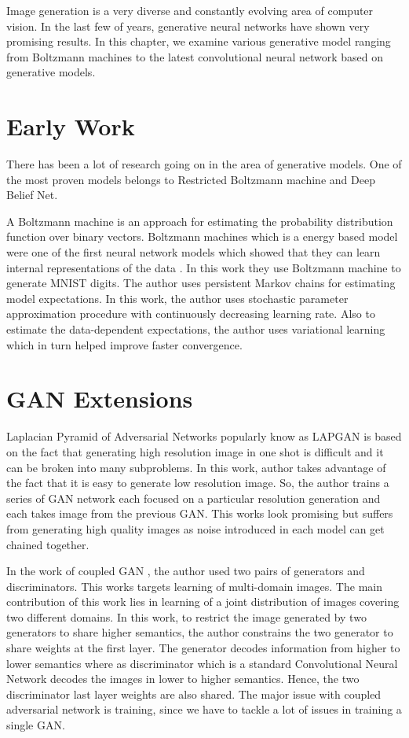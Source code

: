 \doublespacing
{} 
\label{chap:RelatedWork}

Image generation is a very diverse and constantly evolving area of computer vision. In the last few of years, generative neural networks have shown very promising results. In this chapter, we examine various generative model ranging from Boltzmann machines to the latest convolutional neural network based on generative models.
\section{Early Work}

There has been a lot of research going on in the area of generative models. One of the most proven models belongs to Restricted Boltzmann machine and Deep Belief Net.

A Boltzmann machine is an approach for estimating the probability distribution function over binary vectors. Boltzmann machines which is  a energy based model were one of the first neural network models which showed that they can learn internal representations of the data \cite{Boltzman-Wiki}.
In this work they use Boltzmann machine to generate MNIST digits. The author uses persistent Markov chains for estimating model expectations. In this work, the author uses stochastic parameter approximation procedure with continuously decreasing learning rate. Also to estimate the data-dependent expectations, the author uses variational learning which in turn helped improve faster convergence. 



\section{GAN Extensions}

Laplacian Pyramid of Adversarial Networks \cite{LAPGAN} popularly know as LAPGAN is based on the fact that generating high resolution image in one shot is difficult and it can be broken into many subproblems. In this work, author takes advantage of the fact that it is easy to generate low resolution image. So, the author trains a series of GAN network each focused on a particular resolution generation and each takes image from the previous GAN. This works look promising but suffers from generating high quality images as noise introduced in each model can get chained together. 
\par
In the work of coupled GAN \cite{Co-GAN}, the author used two pairs of generators and discriminators. This works targets learning of multi-domain images. The main contribution of this work lies in learning of a joint distribution of images covering two different domains. In this work, to restrict the image generated by two generators to share higher semantics, the author constrains the two generator to share weights at the first layer. The generator decodes information from higher to lower semantics where as discriminator which is a standard Convolutional Neural Network decodes the images in lower to higher semantics. Hence, the two discriminator last layer weights are also shared. The major issue with coupled adversarial network is training, since we have to tackle a lot of issues in training a single GAN.
\par

